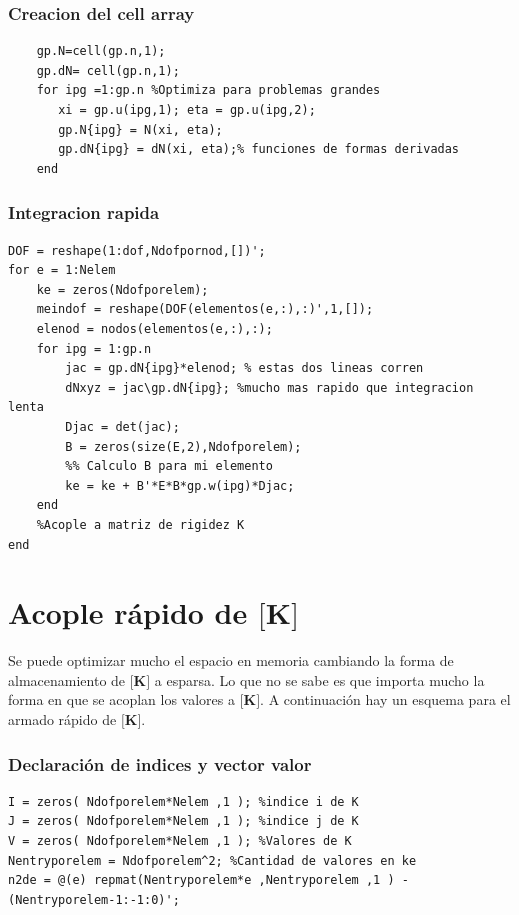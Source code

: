 \documentclass[11pt, a4paper,titlepage]{article}
\newcommand{\Mme}[1]{\boldsymbol{[}\mathbf{#1} \boldsymbol{]}}
\newcommand{\MK}{\Mme{K}}
\begin{document}
\subsubsection*{Creacion del cell array}
\begin{verbatim}
    gp.N=cell(gp.n,1);
    gp.dN= cell(gp.n,1);
    for ipg =1:gp.n %Optimiza para problemas grandes 
       xi = gp.u(ipg,1); eta = gp.u(ipg,2);
       gp.N{ipg} = N(xi, eta);
       gp.dN{ipg} = dN(xi, eta);% funciones de formas derivadas
    end
\end{verbatim}

\subsubsection*{Integracion rapida}

\begin{verbatim}
DOF = reshape(1:dof,Ndofpornod,[])';
for e = 1:Nelem
    ke = zeros(Ndofporelem);
    meindof = reshape(DOF(elementos(e,:),:)',1,[]);
    elenod = nodos(elementos(e,:),:);
    for ipg = 1:gp.n
        jac = gp.dN{ipg}*elenod; % estas dos lineas corren
        dNxyz = jac\gp.dN{ipg}; %mucho mas rapido que integracion lenta
        Djac = det(jac);
        B = zeros(size(E,2),Ndofporelem);
        %% Calculo B para mi elemento
        ke = ke + B'*E*B*gp.w(ipg)*Djac;
    end
    %Acople a matriz de rigidez K
end
\end{verbatim}

\section{Acople rápido de \(\MK \)}

Se puede optimizar mucho el espacio en memoria cambiando la forma de almacenamiento de \(\MK \) a esparsa. Lo que no se sabe es que importa mucho la forma en que se acoplan los valores a \(\MK \). A continuación hay un esquema para el armado rápido de \(\MK \).

\subsubsection*{Declaración de indices y vector valor}
\begin{verbatim}
I = zeros( Ndofporelem*Nelem ,1 ); %indice i de K
J = zeros( Ndofporelem*Nelem ,1 ); %indice j de K
V = zeros( Ndofporelem*Nelem ,1 ); %Valores de K
Nentryporelem = Ndofporelem^2; %Cantidad de valores en ke
n2de = @(e) repmat(Nentryporelem*e ,Nentryporelem ,1 ) - (Nentryporelem-1:-1:0)';
\end{verbatim}
\end{document}
